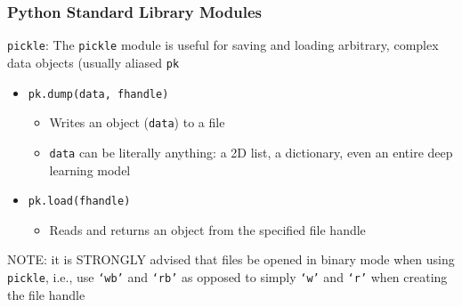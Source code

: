 \documentclass{beamer}
\newcommand{\code}[1]{\texttt{#1}}
\begin{document}
\begin{frame}	
	\frametitle{Python Standard Library Modules}
	
	\begin{block}{\code{pickle}:}
		The \code{pickle} module is useful for saving and loading arbitrary, complex data objects (usually aliased \code{pk}
		\begin{itemize}
			\item \code{pk.dump(data, fhandle)}
			\begin{itemize}
				\item Writes an object (\code{data}) to a file
				\item \code{data} can be literally anything: a 2D list, a dictionary, even an entire deep learning model
			\end{itemize}
			\item \code{pk.load(fhandle)}
			\begin{itemize}
				\item Reads and returns an object from the specified file handle
			\end{itemize}
		\end{itemize}
		NOTE: it is STRONGLY advised that files be opened in binary mode when using \code{pickle}, i.e., use \code{`wb'} and \code{`rb'} as opposed to simply \code{`w'} and \code{`r'} when creating the file handle
	\end{block}
	
\end{frame}
\end{document}
